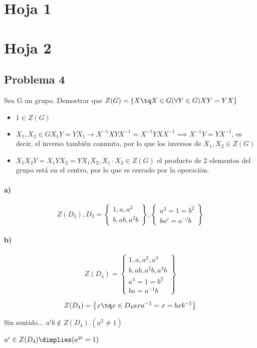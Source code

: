 \documentclass{apuntes}
\begin{document}
\section{Hoja 1}
\section{Hoja 2}
\subsection{Problema 4}
Sea G un grupo. Demostrar que $Z(G) = \{X \tq X\in G (\forall Y \in G) XY = YX\}$

\begin{itemize}
\item $1 \in Z(G)$
\item {$X_1,X_2 \in G X_1Y = YX_1 \rightarrow X^{-1}XYX^{-1} = X^{-1}YXX^{-1} \implies X^{-1}Y=YX^{-1}$, es decir, el inverso también conmuta, por lo que los inversos de $X_1,X_2 \in Z(G)$}
\item {$X_1 X_2 Y = X_1 Y X_2 = YX_1 X_2, X_1 \cdot X_2 \in Z(G)$ el producto de 2 elementos del grupo está en el centro, por lo que es cerrado por la operación.}
\end{itemize}
\paragraph{a)}
$$Z(D_3), D_3 = \left\{\begin{matrix} 1,a,a^2\\b,ab,a^2b\end{matrix}\right\},\left\{\begin{matrix}a^3 = 1 = b^2\\ ba^j = a^{-j}b\end{matrix}\right\}$$

\paragraph{b)}
$$Z(D_4) =\left\{\begin{matrix} 1,a,a^2,a^3\\b,ab,a^2b,a^3b\\a^4=1=b^2\\ba=a^{-1}b\end{matrix}\right\}$$

$$Z(D_4) = \left\{x \tq x\in D_4 axa^{-1} = x = bxb^{-1}\right\}$$

Sin sentido...
$a^ib \notin Z(D_4). (a^2 \neq 1)$

$a^i \in Z(D_4) \dimplies (a^{2i} = 1)$
\end{document}
